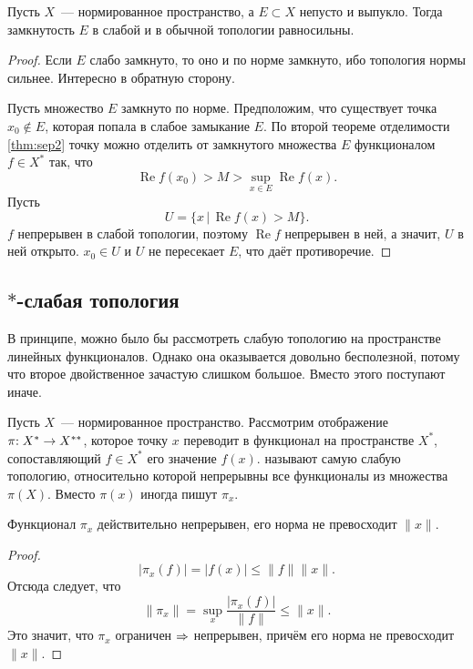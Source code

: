 \documentclass{notes}
\DeclareMathOperator{\re}{Re}
\newcommand{\ta}{$*$}
\begin{document}
	\begin{thm}[Мазура] \label{thm:mas}
		Пусть $X$~--- нормированное пространство, а $E \subset X$ непусто и выпукло. Тогда замкнутость $E$ в слабой и в обычной топологии равносильны.
		\begin{proof}
			Если $E$ слабо замкнуто, то оно и по норме замкнуто, ибо топология нормы сильнее. Интересно в обратную сторону.

			Пусть множество $E$ замкнуто по норме. Предположим, что существует точка $x_0 \notin E$, которая попала в слабое замыкание $E$. По второй теореме отделимости \ref{thm:sep2} точку можно отделить от замкнутого множества $E$ функционалом $f \in X^{*}$ так, что 
			\[
				\re f(x_0) > M > \sup\limits_{x \in E} \re f(x).
			\]
			Пусть 
			\[
				U = \{x \, | \, \re f(x) > M\}.
			\]
			$f$ непрерывен в слабой топологии, поэтому $\re f$ непрерывен в ней, а значит, $U$ в ней открыто. $x_0 \in U$ и $U$ не пересекает $E$, что даёт противоречие.
		\end{proof}
	\end{thm}

\subsection{\ta-слабая топология}

	В принципе, можно было бы рассмотреть слабую топологию на пространстве линейных функционалов. Однако она оказывается довольно бесполезной, потому что второе двойственное зачастую слишком большое. Вместо этого поступают иначе.

	\begin{de}
		Пусть $X$~--- нормированное пространство. Рассмотрим отображение $\pi\text{\text{:}} \; X^* \to X^{**}$, которое точку $x$ переводит в функционал на пространстве $X^{*}$, сопоставляющий $f \in X^{*}$ его значение $f(x)$. \ti{\ta-слабой топологией} называют самую слабую топологию, относительно которой непрерывны все функционалы из множества $\pi(X)$.
		Вместо $\pi(x)$ иногда пишут $\pi_x$.
	\end{de}

	\begin{st}[Корректность]
		\label{st:cor-sweak}
		Функционал $\pi_x$ действительно непрерывен, его норма не превосходит $\|x\|$.
		\begin{proof}
			\[
				\big|\pi_x(f)\big| = \big|f(x)\big| \leqslant \|f\| \|x\|.
			\]
			Отсюда следует, что
			\[
				\|\pi_x\| = \sup\limits_x \dfrac{\big|\pi_x(f)\big|}{\|f\|} \leqslant \|x\|.
			\]
			Это значит, что $\pi_x$ ограничен $\Rightarrow$ непрерывен, причём его норма не превосходит $\|x\|$.
		\end{proof}
	\end{st}
\end{document}
